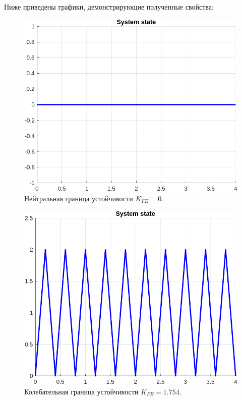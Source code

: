 \documentclass[a4paper, 14pt]{extarticle}
\theoremstyle{definition}
\theoremstyle{plain}
\theoremstyle{remark}
\begin{document}
Ниже приведены графики, демонстрирующие полученные свойства:
\begin{figure}
    [H]
    \centering
    \includegraphics[width=350pt]{images/task1_b__neutral_state.png}
    \caption{Нейтральная граница устойчивости $K_{FE}=0$.}
\end{figure}
\begin{figure}
    [H]
    \centering
    \includegraphics[width=350pt]{images/task1_b__oscill_state.png}
    \caption{Колебательная граница устойчивости $K_{FE}=1.754$.}
\end{figure}
\end{document}
